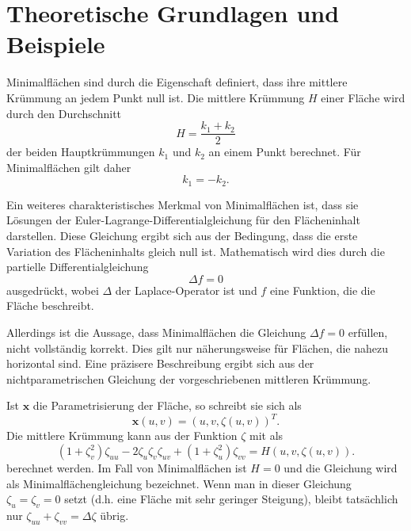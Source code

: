 %
%
%
%
\section{Theoretische Grundlagen und Beispiele
	\label{minimalflaechen:section:Theoretische Grundlagen und Beispiele}}
Minimalflächen sind durch die Eigenschaft definiert, dass ihre
mittlere Krümmung an jedem Punkt null ist.
Die mittlere Krümmung $H$ einer Fläche wird durch den Durchschnitt
%
%
%
\begin{equation}
	H=\frac{k_{1}+k_{2}}{2}
\end{equation}
%
der beiden Hauptkrümmungen $k_1$ und $k_2$ an einem Punkt berechnet.
Für Minimalflächen gilt daher
%
\begin{equation}
	k_{1}=-k_{2}.
\end{equation}

Ein weiteres charakteristisches Merkmal von Minimalflächen ist, dass sie Lösungen der Euler-Lagrange-Differentialgleichung für den Flächeninhalt darstellen.
Diese Gleichung ergibt sich aus der Bedingung, dass die erste Variation des Flächeninhalts gleich null ist.
Mathematisch wird dies durch die partielle Differentialgleichung
%
\begin{equation}
	\Delta f = 0
\end{equation}
%
ausgedrückt, wobei $\Delta$ der Laplace-Operator ist und $f$ eine Funktion, die die Fläche beschreibt.

Allerdings ist die Aussage, dass Minimalflächen die Gleichung \(\Delta f = 0\) erfüllen, nicht vollständig korrekt.
Dies gilt nur näherungsweise für Flächen, die nahezu horizontal sind.
Eine präzisere Beschreibung ergibt sich aus der nichtparametrischen Gleichung der vorgeschriebenen mittleren Krümmung.

Ist \(\mathbf{x}\) die Parametrisierung der Fläche, so schreibt sie sich als
\begin{equation}
\mathbf{x}(u,v) = (u,v,\zeta(u,v))^{T}.
\end{equation}
Die mittlere Krümmung kann aus
der Funktion \(\zeta\) mit als
\begin{equation}
(1 + \zeta_{v}^{2})\zeta_{uu} - 2\zeta_{u}\zeta_{v}\zeta_{uv} + (1 + \zeta_{u}^{2})\zeta_{vv} = H(u,v,\zeta(u,v)).
\end{equation}
berechnet werden.
%
Im Fall von Minimalflächen ist \(H = 0\) und die Gleichung wird als Minimalflächengleichung bezeichnet.
%
Wenn man in dieser Gleichung \(\zeta_u = \zeta_v = 0\) setzt (d.h. eine Fläche mit sehr geringer Steigung), bleibt tatsächlich nur \(\zeta_{uu} + \zeta_{vv} = \Delta \zeta\) übrig. 







